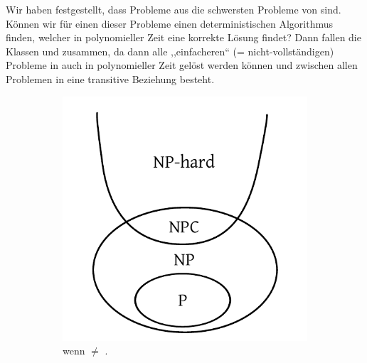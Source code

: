 Wir haben festgestellt, dass Probleme aus \cNPC{} die schwersten Probleme von \cNP{} sind. Können wir für einen dieser Probleme einen deterministischen Algorithmus finden, welcher in polynomieller Zeit eine korrekte Lösung findet? Dann fallen die Klassen \cP{} und \cNP{} zusammen, da dann alle ,,einfacheren`` (= nicht-vollständigen) Probleme in \cNP{} auch in polynomieller Zeit gelöst werden können und zwischen allen Problemen in \cNPC{} eine transitive Beziehung besteht.
%
\begin{figure}
  \begin{center}
    \begin{subfigure}[b]{0.4\textwidth}
      \includegraphics[width=\textwidth]{img/np_neq_p.pdf}
      \caption{wenn \cP{} $\neq$ \cNP{}.}
    \end{subfigure}
    \begin{subfigure}[b]{0.4\textwidth}

\end{subfigure}
\end{center}
\end{figure}
